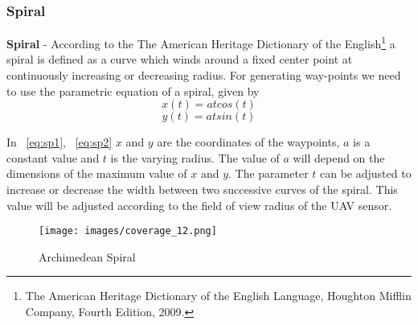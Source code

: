\subsubsection{Spiral}
\textbf{Spiral} - According to the The American Heritage Dictionary of the English\footnote{The American Heritage Dictionary of the English Language, Houghton Mifflin Company, Fourth Edition, 2009.} a spiral is defined as a curve which winds around a fixed center point at continuously increasing or decreasing radius. 
For generating way-points we need to use the parametric equation of a spiral, given by\footnotemark \\ 
\begin{equation}
\label{eq:sp1}
x(t) = at cos(t)
\end{equation}
\begin{equation}
\label{eq:sp2}
y(t) = at sin(t)
\end{equation}

In ~\ref{eq:sp1}, ~\ref{eq:sp2} $x$ and $y$ are the coordinates of the waypoints, $a$ is a constant value and $t$ is the varying radius.
The value of $a$ will depend on the dimensions of the maximum value of $x$ and $y$. The parameter $t$ can be adjusted to increase or decrease the width between two successive curves of the spiral. This value will be adjusted according to the field of view radius of the UAV sensor.

\begin{figure}[htbp] %
 \centering
   \texttt{[image: images/coverage\_12.png]}
   \caption[Archimedean Spiral ]
   {Archimedean Spiral \footnotemark[\value{footnote}]}
   
\label{fig:sc111}
\end{figure}

